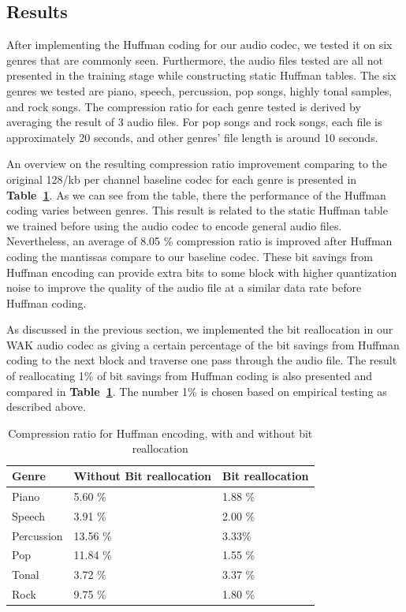 \documentclass{vldb}
\begin{document}
\subsection{Results}
After implementing the Huffman coding for our audio codec, we tested it on six genres that are commonly seen. Furthermore, the audio files tested are all not presented in the training stage while constructing static Huffman tables. The six genres we tested are piano, speech, percussion, pop songs, highly tonal samples, and rock songs. The compression ratio for each genre tested is derived by averaging the result of 3 audio files. For pop songs and rock songs, each file is approximately 20 seconds, and other genres' file length is around 10 seconds.

An overview on the resulting compression ratio improvement comparing to the original 128/kb per channel baseline codec for each genre is presented in \textbf{Table~\ref{table:huffmancompression}}. As we can see from the table, there the performance of the Huffman coding varies between genres. This result is related to the static Huffman table we trained before using the audio codec to encode general audio files. Nevertheless, an average of 8.05 \% compression ratio is improved after Huffman coding the mantissas compare to our baseline codec. These bit savings from Huffman encoding can provide extra bits to some block with higher quantization noise to improve the quality of the audio file at a similar data rate before Huffman coding.

As discussed in the previous section, we implemented the bit reallocation in our WAK audio codec as giving a certain percentage of the bit savings from Huffman coding to the next block and traverse one pass through the audio file. The result of reallocating 1\% of bit savings from Huffman coding is also presented and compared in \textbf{Table~\ref{table:huffmancompression}}. The number 1\% is chosen based on empirical testing as described above.

\begin{table}[ht]
  \centering
    \begin{tabular}{ | l | l | l |}
      \hline
      Genre & Without Bit reallocation & Bit reallocation \\
      \hline
      Piano     & 5.60 \%   & 1.88 \%  \\ 
      Speech     & 3.91 \%  & 2.00 \% \\
      Percussion   & 13.56 \% & 3.33\% \\   
      Pop     & 11.84 \% &  1.55 \%\\    
      Tonal     & 3.72 \% &  3.37 \%\\     
      Rock     & 9.75 \% &  1.80 \%\\ 
      \hline
    \end{tabular}
  \caption{Compression ratio for Huffman encoding, with and without bit reallocation}
  \label{table:huffmancompression}
\end{table}
\end{document}
